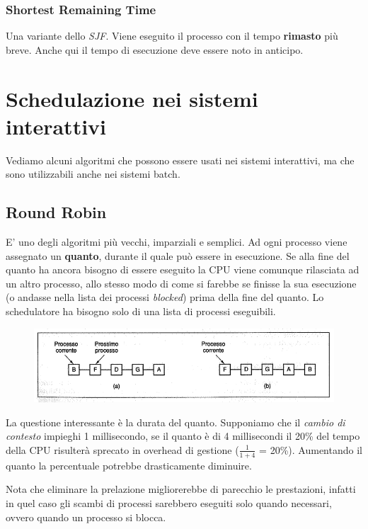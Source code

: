 \subsubsection{Shortest Remaining Time}
Una variante dello \textit{SJF}. Viene eseguito il processo con il tempo \textbf{rimasto} più breve. Anche qui il tempo di esecuzione deve essere noto in anticipo.



\section{Schedulazione nei sistemi interattivi}
Vediamo alcuni algoritmi che possono essere usati nei sistemi interattivi, ma che sono utilizzabili anche nei sistemi batch. 

\subsection{Round Robin}
E' uno degli algoritmi più vecchi, imparziali e semplici.
Ad ogni processo viene assegnato un \textbf{quanto}, durante il quale può essere in esecuzione. Se alla fine del quanto ha ancora bisogno di essere eseguito la CPU viene comunque rilasciata ad un altro processo, allo stesso modo di come si farebbe se finisse la sua esecuzione (o andasse nella lista dei processi \textit{blocked}) prima della fine del quanto.
Lo schedulatore ha bisogno solo di una lista di processi eseguibili.

\begin{figure}[H]
    \centering
    \includegraphics[width=0.6\linewidth]{assets/robin4.png}
    \caption{ }
\end{figure}

La questione interessante è la durata del quanto.
Supponiamo che il \textit{cambio di contesto} impieghi 1 millisecondo, se il quanto è di 4 millisecondi il 20\% del tempo della CPU risulterà sprecato in overhead di gestione ($\frac{1}{1+4}$ = 20\%). Aumentando il quanto la percentuale potrebbe drasticamente diminuire.

Nota che eliminare la prelazione migliorerebbe di parecchio le prestazioni, infatti in quel caso gli scambi di processi sarebbero eseguiti solo quando necessari, ovvero quando un processo si blocca.

